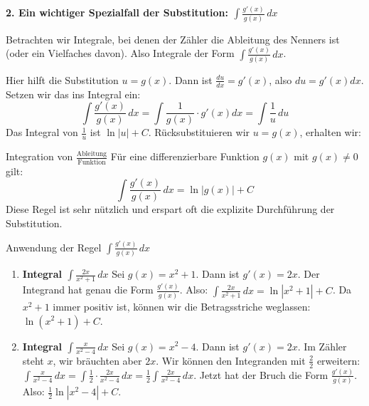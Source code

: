 \textbf{2. Ein wichtiger Spezialfall der Substitution: $\int \frac{g'(x)}{g(x)} \,dx$}

Betrachten wir Integrale, bei denen der Zähler die Ableitung des Nenners ist (oder ein Vielfaches davon).
Also Integrale der Form $\int \frac{g'(x)}{g(x)} \,dx$.

Hier hilft die Substitution $u = g(x)$.
Dann ist $\frac{du}{dx} = g'(x)$, also $du = g'(x)dx$.
Setzen wir das ins Integral ein:
\[ \int \frac{g'(x)}{g(x)} \,dx = \int \frac{1}{g(x)} \cdot g'(x)dx = \int \frac{1}{u} \,du \]
Das Integral von $\frac{1}{u}$ ist $\ln|u|+C$.
Rücksubstituieren wir $u=g(x)$, erhalten wir:

\begin{merksatzumgebung}{Integration von $\frac{\text{Ableitung}}{\text{Funktion}}$}
Für eine differenzierbare Funktion $g(x)$ mit $g(x) \neq 0$ gilt:
\[ \int \frac{g'(x)}{g(x)} \,dx = \ln|g(x)| + C \]
Diese Regel ist sehr nützlich und erspart oft die explizite Durchführung der Substitution.
\end{merksatzumgebung}

\begin{beispielumgebung}{Anwendung der Regel \texorpdfstring{$\int \frac{g'(x)}{g(x)} \,dx$}{Integral g'(x)/g(x) dx}}
\begin{enumerate}
    \item \textbf{Integral $\int \frac{2x}{x^2+1} \,dx$}
        Sei $g(x) = x^2+1$. Dann ist $g'(x) = 2x$.
        Der Integrand hat genau die Form $\frac{g'(x)}{g(x)}$.
        Also: $\int \frac{2x}{x^2+1} \,dx = \ln|x^2+1| + C$.
        Da $x^2+1$ immer positiv ist, können wir die Betragsstriche weglassen: $\ln(x^2+1) + C$.

    \item \textbf{Integral $\int \frac{x}{x^2-4} \,dx$}
        Sei $g(x) = x^2-4$. Dann ist $g'(x) = 2x$.
        Im Zähler steht $x$, wir bräuchten aber $2x$. Wir können den Integranden mit $\frac{2}{2}$ erweitern:
        $\int \frac{x}{x^2-4} \,dx = \int \frac{1}{2} \cdot \frac{2x}{x^2-4} \,dx = \frac{1}{2} \int \frac{2x}{x^2-4} \,dx$.
        Jetzt hat der Bruch die Form $\frac{g'(x)}{g(x)}$.
        Also: $\frac{1}{2} \ln|x^2-4| + C$.
\end{enumerate}
\end{beispielumgebung}

